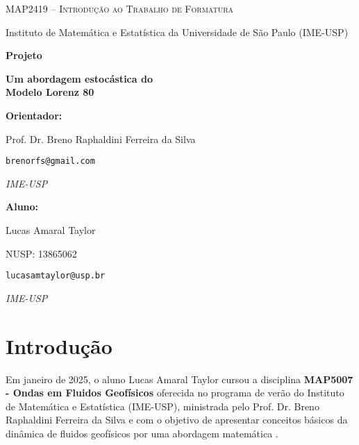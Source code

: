 \documentclass[12pt]{article}
\begin{document}
\begin{titlepage}
    \centering
    {\Large\scshape MAP2419 -- Introdução ao Trabalho de Formatura \par}
    \vspace{0.3cm}
    {\large Instituto de Matemática e Estatística da Universidade de São Paulo (IME-USP)\par}
    
    \vspace{3cm}
    
    {\LARGE\bfseries Projeto\par}
    \vspace{1cm}
    {\LARGE\bfseries Um abordagem estocástica do\\ Modelo Lorenz 80\par}
    
    \vfill
    
    \begin{minipage}[t]{0.45\textwidth}
        \raggedright
        \textbf{Orientador:} \par
        Prof. Dr. Breno Raphaldini Ferreira da Silva  \par
        \texttt{brenorfs@gmail.com} \par
        \textit{IME-USP} \par\medskip
    \end{minipage}
    \hfill
    \begin{minipage}[t]{0.45\textwidth}
        \raggedright
        \textbf{Aluno:} \par
        Lucas Amaral Taylor \par
        NUSP: 13865062 \par
        \texttt{lucasamtaylor@usp.br} \par
        \textit{IME-USP}
    \end{minipage}
    \vspace{2cm}
\end{titlepage}

\section*{Introdução}
Em janeiro de 2025, o aluno Lucas Amaral Taylor cursou a disciplina \textbf{MAP5007 - Ondas em Fluidos Geofísicos} oferecida no programa de verão do Instituto de Matemática e Estatística (IME-USP), ministrada pelo Prof. Dr. Breno Raphaldini Ferreira da Silva e com o objetivo de apresentar conceitos básicos da dinâmica de fluidos geofísicos por uma abordagem matemática \citep{uspJanus}. 
\end{document}
